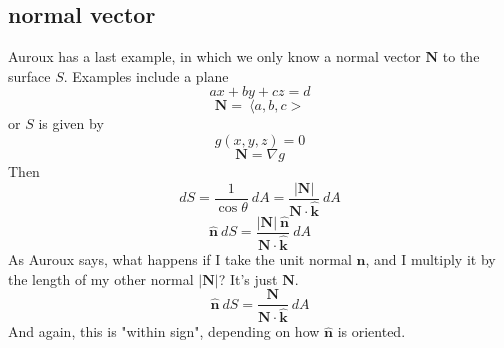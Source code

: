 \documentclass[11pt, oneside]{article}
\begin{document}
\subsection*{normal vector}
Auroux has a last example, in which we only know a normal vector $\mathbf{N}$ to the surface $S$.  Examples include a plane 
\[ ax + by + cz = d  \]
\[ \mathbf{N} = \ \langle a,b,c> \]
or $S$ is given by 
\[ g(x,y,z) = 0 \]
\[ \mathbf{N} = \nabla g \]
Then
\[ dS = \frac{1}{\cos \theta} \ dA = \frac{|\mathbf{N}|}{\mathbf{N} \cdot \hat{\mathbf{k}}} \ dA \]
\[ \hat{\mathbf{n}} \ dS  = \frac{|\mathbf{N}| \ \hat{\mathbf{n}}}{\mathbf{N} \cdot \hat{\mathbf{k}}} \ dA \]
As Auroux says, what happens if I take the unit normal $\mathbf{n}$, and I multiply it by the length of my other normal $|\mathbf{N}|$?  It's just $\mathbf{N}$.
\[ \hat{\mathbf{n}} \ dS  = \frac{\mathbf{N}}{\mathbf{N} \cdot \hat{\mathbf{k}}} \ dA \]
And again, this is "within sign", depending on how $\hat{\mathbf{n}}$ is oriented.
\end{document}
